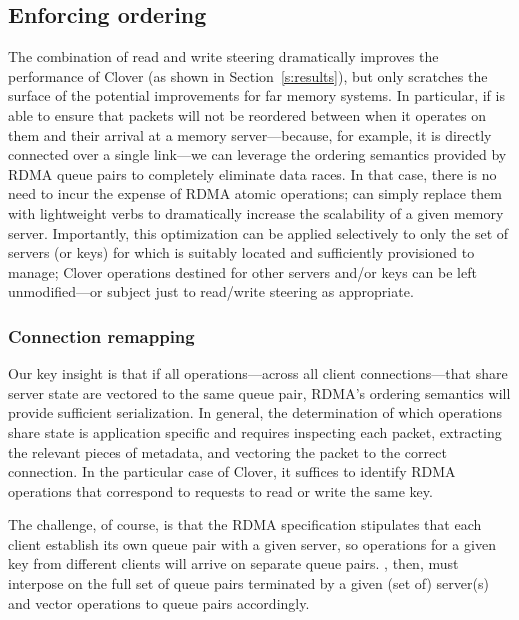\subsection{Enforcing ordering}

The combination of read and write steering dramatically improves the
performance of Clover (as shown in Section~\ref{s:results}), but only
scratches the surface of the potential improvements for far memory
systems.  In particular, if {\sword} is able to ensure that
packets will not be reordered between when it operates on them and
their arrival at a memory server---because, for example, it is
directly connected over a single link---we can leverage the ordering
semantics provided by RDMA queue pairs to completely eliminate data
races.  In that case, there is no need to incur the expense of RDMA
atomic operations; {\sword} can simply replace them with lightweight verbs
to dramatically increase the scalability of a given memory server.
Importantly, this optimization can be applied selectively to only the
set of servers (or keys) for which {\sword} is suitably located
and sufficiently provisioned to manage; Clover operations destined
for other servers and/or keys can be left unmodified---or subject just
to read/write steering as appropriate.

\subsubsection{Connection remapping}

Our key insight is that if all operations---across all client
connections---that share server state are vectored to the same queue
pair, RDMA's ordering semantics will provide sufficient serialization.
In general, the determination of which operations share state is
application specific and requires inspecting each packet, extracting
the relevant pieces of metadata, and vectoring the packet to the
correct connection.  In the particular case of Clover, it suffices to
identify RDMA operations that correspond to requests to read or write
the same key.


The challenge, of course, is that the RDMA specification stipulates
that each client establish its own queue pair with a given server, so
operations for a given key from different clients will arrive on
separate queue pairs.  \sword, then, must interpose on the
full set of queue pairs terminated by a given (set of) server(s) and
vector operations to queue pairs accordingly.


